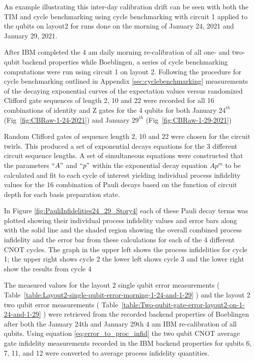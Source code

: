 An example illustrating this inter-day calibration drift can be seen with both the TIM and cycle benchmarking using cycle benchmarking with circuit 1 applied to the qubits on layout2 for runs done on the morning of January 24, 2021 and January 29, 2021.  

After IBM completed the 4 am daily morning re-calibration of all one- and two-qubit backend properties while Boeblingen, a series of cycle benchmarking computations were run using circuit 1 on layout 2.  Following the procedure for cycle benchmarking outlined in Appendix \ref{sec:cyclebenchmarking} measurements of the decaying exponential curves of the expectation values versus randomized Clifford gate sequences of length 2, 10 and 22 were recorded for all 16 combinations of identity and Z gates for the 4 qubits for both January $24^{th}$ (Fig~\ref{fig:CBRaw-1-24-2021}) and January $29^{th}$ (Fig~\ref{fig:CBRaw-1-29-2021})

Random Clifford gates of sequence length 2, 10 and 22 were chosen for the circuit twirls.  This produced a set of exponential decays equations for the 3 different circuit sequence lengths.  A set of simultaneous equations were constructed that the parameters $``A"$ and $``p"$ within the exponential decay equation $Ap^{m}$ to be calculated and fit to each cycle of interest yielding individual process infidelity values for the 16 combination of Pauli decays based on the function of circuit depth for each basis preparation state. 

In Figure \ref{fig:PauliInfidelities24_29_Story4} each of these Pauli decay terms was plotted showing their individual process infidelity values and error bars along with the solid line and the shaded region showing the overall combined process infidelity and the error bar from these calculations for each of the 4 different CNOT cycles.  The graph in the upper left shows the process infidelities for cycle 1; the upper right shows cycle 2 the lower left shows cycle 3 and the lower right show the results from cycle 4

The measured values for the layout 2 single qubit error measurements ( Table~\ref{table:Layout2-single-qubit-error-morning-1-24-and-1-29} ) and the layout 2 two qubit error measurements ( Table~\ref{table:Two-qubit-gate-error-layout2-on-1-24-and-1-29} ) 
were retrieved from the recorded backend properties of Boeblingen after both the January 24th and January 29th 4 am IBM re-calibration of all qubits.  Using equation \ref{eq:error_to_proc_infid}
the two qubit CNOT average gate infidelity measurements recorded in the IBM backend properties for qubits 6, 7, 11, and 12 were converted to average process infidelity quantities.  

